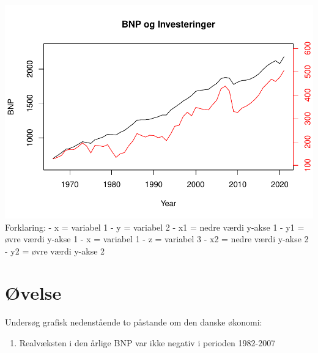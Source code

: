 \documentclass[
  12pt,
]{article}
\newenvironment{Shaded}{\begin{snugshade}}{\end{snugshade}}
\newcommand{\AttributeTok}[1]{\textcolor[rgb]{0.77,0.63,0.00}{#1}}
\newcommand{\DecValTok}[1]{\textcolor[rgb]{0.00,0.00,0.81}{#1}}
\newcommand{\FunctionTok}[1]{\textcolor[rgb]{0.00,0.00,0.00}{#1}}
\newcommand{\NormalTok}[1]{#1}
\newcommand{\SpecialCharTok}[1]{\textcolor[rgb]{0.00,0.00,0.00}{#1}}
\newcommand{\StringTok}[1]{\textcolor[rgb]{0.31,0.60,0.02}{#1}}
\providecommand{\tightlist}{%
  \setlength{\itemsep}{0pt}\setlength{\parskip}{0pt}}
\begin{document}
\includegraphics{Rkursus_done_files/figure-latex/unnamed-chunk-14-1.pdf}
Forklaring: - x = variabel 1 - y = variabel 2 - x1 = nedre værdi y-akse
1 - y1 = øvre værdi y-akse 1 - x = variabel 1 - z = variabel 3 - x2 =
nedre værdi y-akse 2 - y2 = øvre værdi y-akse 2

\hypertarget{uxf8velse-3}{%
\section{Øvelse}\label{uxf8velse-3}}

Undersøg grafisk nedenstående to påstande om den danske økonomi:

\begin{enumerate}
\def\labelenumi{\arabic{enumi}.}
\tightlist
\item
  Realvæksten i den årlige BNP var ikke negativ i perioden 1982-2007
\end{enumerate}

\begin{Shaded}
\end{Shaded}
\end{document}
